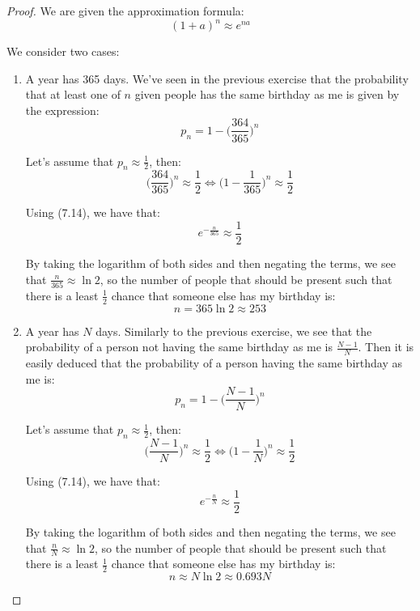 \vspace{1em}

\begin{proof}
    We are given the approximation formula:
    \begin{equation*}\tag{7.14}
        (1 + a)^n \approx e^{na}
    \end{equation*}

    We consider two cases:
    \begin{enumerate}[(1)]
        \item A year has 365 days. We've seen in the previous exercise that the probability that at 
            least one of $n$ given people has the same birthday as me is given by the expression:
            \[
                p_n = 1 - \bigg(\frac{364}{365}\bigg)^n 
            \] 

            Let's assume that $p_n \approx \frac{1}{2}$, then:
            \[
                \bigg(\frac{364}{365}\bigg)^n \approx \frac{1}{2} \iff
                \bigg(1 - \frac{1}{365}\bigg)^n \approx \frac{1}{2} 
            \] 

            Using (7.14), we have that:
            \[
               e^{-\frac{n}{365}} \approx \frac{1}{2}
            \] 

            By taking the logarithm of both sides and then negating the terms, we see that 
            $\frac{n}{365} \approx \ln{2}$, so the number of people that should be present such
            that there is a least $\frac{1}{2}$ chance that someone else has my birthday is:
            \[
                n = 365 \ln{2} \approx 253 
            \] 

        \item A year has $N$ days. Similarly to the previous exercise, we see that the probability
            of a person not having the same birthday as me is $\frac{N - 1}{N}$. Then it is 
            easily deduced that the probability of a person having the same birthday as me is:
            \[
                p_n = 1 - \bigg(\frac{N - 1}{N}\bigg)^n 
            \] 

            Let's assume that $p_n \approx \frac{1}{2}$, then:
            \[
                \bigg(\frac{N - 1}{N}\bigg)^n \approx \frac{1}{2} \iff
                \bigg(1 - \frac{1}{N}\bigg)^n \approx \frac{1}{2} 
            \] 

            Using (7.14), we have that:
            \[
               e^{-\frac{n}{N}} \approx \frac{1}{2}
            \] 

            By taking the logarithm of both sides and then negating the terms, we see that 
            $\frac{n}{N} \approx \ln{2}$, so the number of people that should be present such
            that there is a least $\frac{1}{2}$ chance that someone else has my birthday is:
            \[
                n \approx N\ln{2} \approx 0.693N
            \]
    \end{enumerate}
\end{proof}

